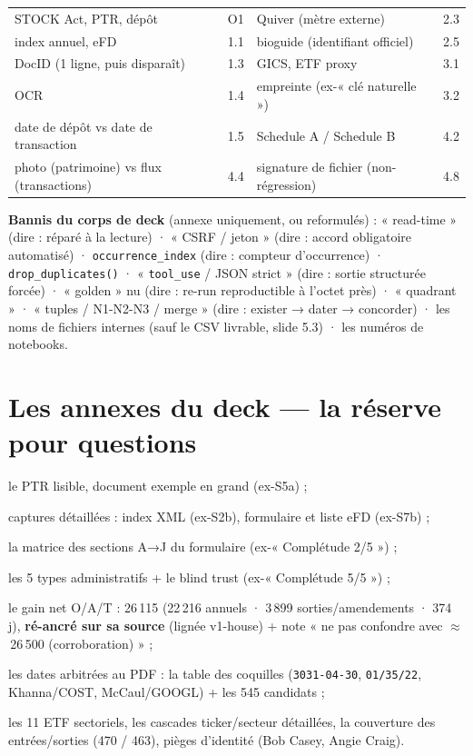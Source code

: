 \documentclass[11pt,a4paper]{article}
\newcommand{\co}[1]{\texttt{#1}}
\begin{document}
\begin{center}\small
\begin{tabular}{@{}l l l l@{}}
\toprule
STOCK Act, PTR, dépôt & O1 & Quiver (mètre externe) & 2.3 \\
index annuel, eFD & 1.1 & bioguide (identifiant officiel) & 2.5 \\
DocID (1 ligne, puis disparaît) & 1.3 & GICS, ETF proxy & 3.1 \\
OCR & 1.4 & empreinte (ex-« clé naturelle ») & 3.2 \\
date de dépôt vs date de transaction & 1.5 & Schedule A / Schedule B & 4.2 \\
photo (patrimoine) vs flux (transactions) & 4.4 & signature de fichier (non-régression) & 4.8 \\
\bottomrule
\end{tabular}
\end{center}

\noindent\textbf{Bannis du corps de deck} (annexe uniquement, ou reformulés) :
« read-time » (dire : réparé à la lecture) · « CSRF / jeton » (dire : accord obligatoire
automatisé) · \co{occurrence\_index} (dire : compteur d'occurrence) ·
\co{drop\_duplicates()} · « \co{tool\_use} / JSON strict » (dire : sortie structurée
forcée) · « golden » nu (dire : re-run reproductible à l'octet près) · « quadrant » ·
« tuples / N1-N2-N3 / merge » (dire : exister → dater → concorder) · les noms de fichiers
internes (sauf le CSV livrable, slide 5.3) · les numéros de notebooks.

\section{Les annexes du deck --- la réserve pour questions}
\label{sec:annexes}

\begin{description}[itemsep=1pt, topsep=2pt, font=\normalfont\bfseries]
  \item[A1] le PTR lisible, document exemple en grand (ex-S5a) ;
  \item[A2] captures détaillées : index XML (ex-S2b), formulaire et liste eFD (ex-S7b) ;
  \item[A3] la matrice des sections A→J du formulaire (ex-« Complétude 2/5 ») ;
  \item[A4] les 5 types administratifs + le blind trust (ex-« Complétude 5/5 ») ;
  \item[A5] le gain net O/A/T : 26\,115 (22\,216 annuels · 3\,899 sorties/amendements ·
        374 j), \textbf{ré-ancré sur sa source} (lignée v1-house) + note « ne pas confondre
        avec $\approx$\,26\,500 (corroboration) » ;
  \item[A6] les dates arbitrées au PDF : la table des coquilles (\co{3031-04-30},
        \co{01/35/22}, Khanna/COST, McCaul/GOOGL) + les 545 candidats ;
  \item[A7] les 11 ETF sectoriels, les cascades ticker/secteur détaillées, la couverture
        des entrées/sorties (470 / 463), pièges d'identité (Bob Casey, Angie Craig).
\end{description}
\end{document}
